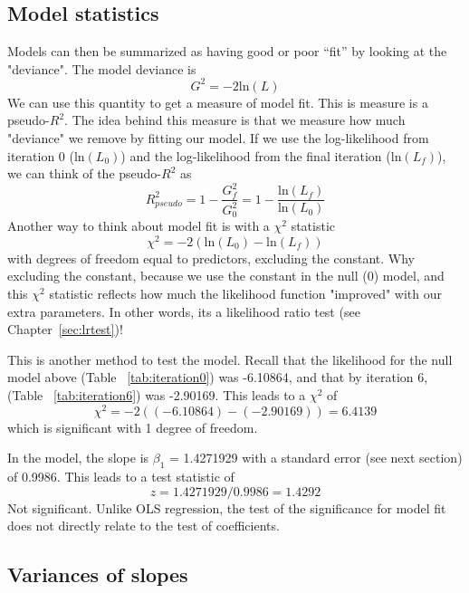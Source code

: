 \subsection{Model statistics}

Models can then be summarized as having good or poor “fit” by looking at the "deviance". The model deviance is
\begin{equation}
G^2 = -2\mbox{ln}\left(L\right)
\end{equation}
We can use this quantity to get a measure of model fit. This is measure is a pseudo-$R^2$. The idea behind this measure is that we measure how much "deviance" we remove by fitting our model. If we use the log-likelihood from iteration 0 ($\mbox{ln}\left(L_0\right)$) and the log-likelihood from the final iteration ($\mbox{ln}\left(L_f\right)$), we can think of the pseudo-$R^2$ as
\begin{equation}
R^2_{pseudo}=1-\frac{G^2_f}{G^2_0}=1-\frac{\mbox{ln}\left(L_f\right)}{\mbox{ln}\left(L_0\right)}
\end{equation}
Another way to think about model fit is with a $\chi^2$ statistic
\begin{equation}
\chi^2 = -2\left(\mbox{ln}\left(L_0\right)-\mbox{ln}\left(L_f\right)\right)
\end{equation}
with degrees of freedom equal to predictors, excluding the constant. Why excluding the constant, because we use the constant in the null (0) model, and this $\chi^2$ statistic reflects how much the likelihood function "improved" with our extra parameters. In other words, its a likelihood ratio test (see Chapter~\ref{sec:lrtest})!

This is another method to test the model. Recall that the likelihood for the null model above (Table ~\ref{tab:iteration0}) was -6.10864, and that by iteration 6, (Table ~\ref{tab:iteration6}) was -2.90169. This leads to a $\chi^2$ of
\[
\chi^2 = -2((-6.10864)-(-2.90169)) = 6.4139
\]
which is significant with 1 degree of freedom.

In the model, the slope is $\beta_1$ = 1.4271929 with a standard error (see next section) of 0.9986. This leads to a test statistic of
\[
z = 1.4271929/0.9986 = 1.4292
\]
Not significant. Unlike OLS regression, the test of the significance for model fit does not directly relate to the test of coefficients.

\subsection{Variances of slopes}


